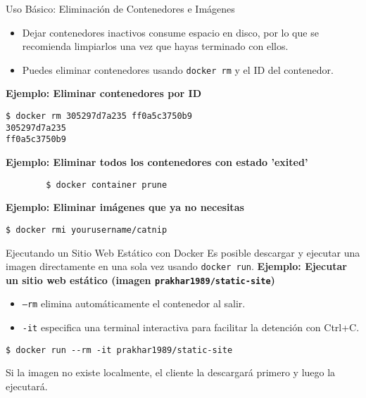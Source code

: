\documentclass[aspectratio=169]{beamer} %
\begin{document}
\begin{frame}[containsverbatim]{Uso Básico: Eliminación de Contenedores e Imágenes}
    \begin{itemize}
        \item Dejar contenedores inactivos consume espacio en disco, por lo que se recomienda limpiarlos una vez que hayas terminado con ellos.
        \item Puedes eliminar contenedores usando \texttt{docker rm} y el ID del contenedor.
    \end{itemize}
    \vspace{0.5cm}
    \textbf{Ejemplo: Eliminar contenedores por ID}
    \begin{verbatim}
$ docker rm 305297d7a235 ff0a5c3750b9
305297d7a235
ff0a5c3750b9
    \end{verbatim}
    \vspace{0.5cm}
    \textbf{Ejemplo: Eliminar todos los contenedores con estado 'exited'}
    \begin{verbatim}
        $ docker container prune
    \end{verbatim}

    \vspace{0.5cm}

    \textbf{Ejemplo: Eliminar imágenes que ya no necesitas}
    \begin{verbatim}
$ docker rmi yourusername/catnip
    \end{verbatim}
\end{frame}

\begin{frame}[containsverbatim]{Ejecutando un Sitio Web Estático con Docker}
Es posible descargar y ejecutar una imagen directamente en una sola vez usando \texttt{docker run}.
    \vspace{0.5cm}
    \textbf{Ejemplo: Ejecutar un sitio web estático (imagen \texttt{prakhar1989/static-site})}
    \begin{itemize}
        \item \texttt{--rm} elimina automáticamente el contenedor al salir.
        \item \texttt{-it} especifica una terminal interactiva para facilitar la detención con Ctrl+C.
    \end{itemize}
    \begin{verbatim}
$ docker run --rm -it prakhar1989/static-site
    \end{verbatim}
    Si la imagen no existe localmente, el cliente la descargará primero y luego la ejecutará.
\end{frame}
\end{document}
